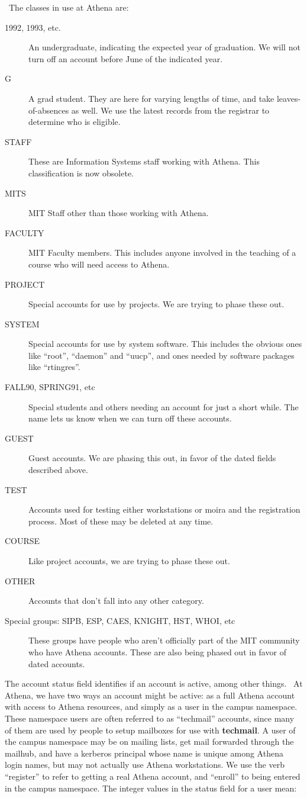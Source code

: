\documentclass{book}
\begin{document}
\athena\ The classes in use at Athena are:
\label{accountclass}
\begin{description}
\item[1992, 1993, etc.] An undergraduate, indicating the expected year of
graduation.  We will not turn off an account before June of the
indicated year.
\item[G] A grad student.  They are here for varying lengths of time, and
take leaves-of-absences as well.  We use the latest records from the
registrar to determine who is eligible.
\item[STAFF] These are Information Systems staff working with Athena.
This classification is now obsolete.
\item[MITS] MIT Staff other than those working with Athena.
\item[FACULTY] MIT Faculty members.  This includes anyone involved in the
teaching of a course who will need access to Athena.
\item[PROJECT] Special accounts for use by projects.  We are trying to phase
these out.
\item[SYSTEM] Special accounts for use by system software.  This includes
the obvious ones like ``root'', ``daemon'' and ``uucp'', and ones needed by
software packages like ``rtingres''.
\item[FALL90, SPRING91, etc] Special students and others needing an account
for just a short while.  The name lets us know when we can turn off
these accounts.
\item[GUEST] Guest accounts.  We are phasing this out, in favor of
the dated fields described above.
\item[TEST] Accounts used for testing either workstations or moira and the
registration process.  Most of these may be deleted at any time.
\item[COURSE] Like project accounts, we are trying to phase these out.
\item[OTHER] Accounts that don't fall into any other category.
\item[Special groups: SIPB, ESP, CAES, KNIGHT, HST, WHOI, etc] These
groups have people who aren't officially part of the MIT community who
have Athena accounts.  These are also being phased out in favor of
dated accounts.
\end{description}

 The account status field identifies if an account is
active, among other things.  \athena\ At Athena, we have two ways an
account might be active: as a full Athena account with access to
Athena resources, and simply as a user in the campus namespace.
 These namespace users are often referred to as
``techmail'' accounts, since many of them are used by people to setup
mailboxes for use with {\bf techmail}.  A user of the campus namespace
may be on mailing lists, get mail forwarded through the mailhub, and
have a kerberos principal whose name is unique among Athena login
names, but may not actually use Athena workstations.
 We use the verb ``register'' to refer
to getting a real Athena account, and ``enroll'' to being entered in
the campus namespace.  The integer values in the status field for a
user mean:
\end{document}
